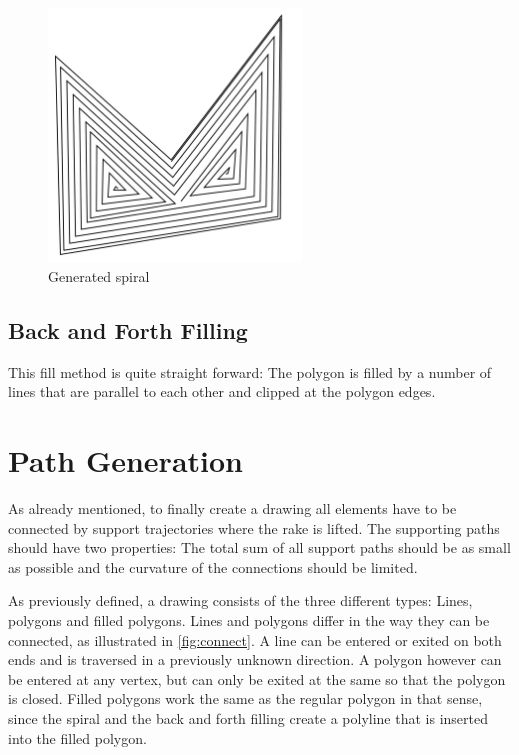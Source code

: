 \begin{figure}
\centering
\includegraphics[width=0.6\textwidth]{images/algorithms/spiral_fill/spiral_real.pdf}
\caption{Generated spiral} \label{fig:gen_spiral}
\end{figure}

\subsection{Back and Forth Filling}

This fill method is quite straight forward: The polygon is filled by a number of lines that are parallel to each other and clipped at the polygon edges. 

\section{Path Generation}
As already mentioned, to finally create a drawing all elements have to be connected by support trajectories where the rake is lifted. The supporting paths should have two properties: The total sum of all support paths should be as small as possible and the curvature of the connections should be limited.

As previously defined, a drawing consists of the three different types: Lines, polygons and filled polygons. Lines and polygons differ in the way they can be connected, as illustrated in \autoref{fig:connect}. A line can be entered or exited on both ends and is traversed in a previously unknown direction. A polygon however can be entered at any vertex, but can only be exited at the same so that the polygon is closed. Filled polygons work the same as the regular polygon in that sense, since the spiral and the back and forth filling create a polyline that is inserted into the filled polygon.

